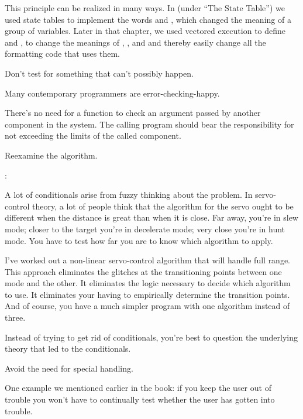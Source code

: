This principle can be realized in many ways. In 
(under ``The State Table'') we used state tables to implement the words
 and , which changed the meaning of a group
of variables. Later in that chapter, we used vectored execution to define
 and , to change the meanings of , ,
 and  and thereby easily change all the formatting code that
uses them.

\begin{tip}
Don't test for something that can't possibly happen.
\end{tip}
Many contemporary programmers are error-checking-happy.

There's no need for a function to check an argument passed by
another component in the system. The calling program should bear the
responsibility for not exceeding the limits of the called component.
%
\begin{tip}
Reexamine the algorithm.
\end{tip}
\begin{interview}
:
\begin{tfquot}
A lot of conditionals arise from fuzzy thinking about the problem. In
servo-control theory, a lot of people think that the algorithm for the servo
ought to be different when the distance is great than when it is close. Far
away, you're in slew mode; closer to the target you're in decelerate mode;
very close you're in hunt mode. You have to test how far you are to know
which algorithm to apply.

I've worked out a non-linear servo-control algorithm that will handle full
range. This approach eliminates the glitches at the transitioning points
between one mode and the other. It eliminates the logic necessary to decide
which algorithm to use. It eliminates your having to empirically determine
the transition points. And of course, you have a much simpler program with
one algorithm instead of three.

Instead of trying to get rid of conditionals, you're best to question the
underlying theory that led to the conditionals.
\end{tfquot}
\end{interview}%
\begin{tip}
Avoid the need for special handling.
\end{tip}
One example we mentioned earlier in the book: if you keep the user out of
trouble you won't have to continually test whether the user has gotten
into trouble.

